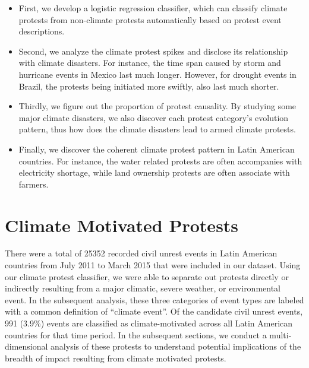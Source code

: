 \documentclass[9pt,twocolumn,twoside]{pnas-new}
\begin{document}
\begin{itemize}
  \item First, we develop a logistic regression classifier, which can classify climate protests from non-climate protests automatically based on protest event descriptions.
  \item Second, we analyze the climate protest spikes and disclose its relationship with climate disasters. For instance, the time span caused by storm and hurricane events in Mexico last much longer. However, for drought events in Brazil, the protests being initiated more swiftly, also last much shorter.
  \item Thirdly, we figure out the proportion of protest causality. By studying some major climate disasters, we also discover each protest category's evolution pattern, thus how does the climate disasters lead to armed climate protests.
  \item Finally, we discover the coherent climate protest pattern in Latin American countries. For instance, the water related protests are often accompanies with electricity shortage, while land ownership protests are often associate with farmers.
\end{itemize}
%
%


%



\section{Climate Motivated Protests}
There were a total of 25352 recorded civil unrest events in Latin American countries from July 2011 to March 2015 that were included in our dataset.
Using our climate protest classifier, we were able to separate out protests directly or indirectly resulting from a major climatic, severe weather, or environmental event.
In the subsequent analysis, these three categories of event types are labeled with a common definition of ``climate event''.
Of the candidate civil unrest events, 991 (3.9\%) events are classified as climate-motivated across all Latin American countries for that time period.
In the subsequent sections, we conduct a multi-dimensional analysis of these protests to understand potential implications of the breadth of impact resulting from climate motivated protests.
\end{document}
